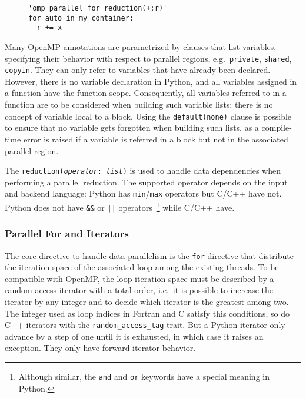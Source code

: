 \documentclass{llncs}
\begin{document}
\begin{figure}
    \begin{lstlisting}[label={lst:instruction-annotation}, caption={Parallel
    loop with reduction annotated with OpenMP directive.}]
'omp parallel for reduction(+:r)'
for auto in my_container:
  r += x
  \end{lstlisting}
\end{figure}

Many OpenMP annotations are parametrized by clauses that list variables,
specifying their behavior with respect to parallel regions, e.g.\
\texttt{private}, \texttt{shared}, \texttt{copyin}. They can only refer to
variables that have already been declared. However, there is no variable
declaration in Python, and all variables assigned in a function have the
function scope. Consequently, all variables referred to in a function are to be
considered when building such variable lists: there is no concept of variable
local to a block. Using the \texttt{default(none)} clause is possible to ensure
that no variable gets forgotten when building such lists, as a compile-time
error is raised if a variable is referred in a block but not in the associated
parallel region.

The \texttt{reduction(\emph{operator}: \emph{list})} is used to handle data
dependencies when performing a parallel reduction. The supported operator
depends on the input and backend language: Python has \texttt{min}/\texttt{max} operators but
C/C++ have not. Python does not have \texttt{\&\&} or \texttt{||}
operators~\footnote{Although similar, the \texttt{and} and \texttt{or} keywords
have a special meaning in Python.} while C/C++ have.

\subsubsection{Parallel For and Iterators}

The core directive to handle data parallelism is the \texttt{for} directive that
distribute the iteration space of the associated loop among the existing
threads. To be compatible with OpenMP, the loop iteration space must be
described by a random access iterator with a total order, i.e.\ it is possible
to increase the iterator by any integer and to decide which iterator is the
greatest among two. The integer used as loop indices in Fortran and C satisfy
this conditions, so do C++ iterators with the \texttt{random\_access\_tag}
trait. But a Python iterator only advance by a step of one until it is
exhausted, in which case it raises an exception. They only have forward iterator
behavior.
\end{document}
